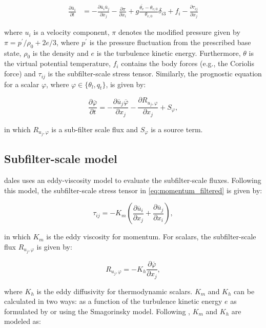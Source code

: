 \begin{align}
    \frac{\partial \overline{u}_i}{\partial t} &= - \frac{\partial \overline{u}_i \overline{u}_j}{\partial x_j} - \frac{\partial \pi}{\partial x_i} + g \frac{\overline{\theta_v} - \theta_{v,0}}{\theta_{v,0}} \delta_{i3} + f_i - \frac{\partial \tau_{ij}}{\partial x_j} \label{eq:momentum_conservation}
\end{align}

where $u_i$ is a velocity component, $\pi$ denotes the modified pressure given by $\pi = p^\prime/\rho_0 + 2e/3$, where $p^\prime$ is the pressure fluctuation from the prescribed base state, $\rho_0$ is the density and $e$ is the turbulence kinetic energy. Furthermore, $\theta$ is the virtual potential temperature, $f_i$ contains the body forces (e.g., the Coriolis force) and $\tau_{ij}$ is the subfilter-scale stress tensor. Similarly, the prognostic equation for a scalar $\varphi$, where $\varphi \in \{\theta_l, q_t\}$, is given by:

\begin{equation}
    \frac{\partial \overline{\varphi}}{\partial t} = - \frac{\partial \overline{u}_j \overline{\varphi}}{\partial x_j} - \frac{\partial R_{u_j,\varphi}}{\partial x_j} + S_\varphi,
\end{equation}

in which $R_{u_j,\varphi}$ is a sub-filter scale flux and $S_\varphi$ is a source term.

\subsection{Subfilter-scale model}
\acrshort{dales} uses an eddy-viscosity model to evaluate the subfilter-scale fluxes. Following this model, the subfilter-scale stress tensor in \autoref{eq:momentum_filtered} is given by:

\begin{equation}
    \tau_{ij} = - K_m \left( \frac{\partial \overline{u}_i}{\partial x_j} + \frac{\partial \overline{u}_j}{\partial x_i} \right),
\end{equation}

in which $K_m$ is the eddy viscosity for momentum. For scalars, the subfilter-scale flux $R_{u_j,\varphi}$ is given by:

\begin{equation}
    R_{u_j,\varphi} = - K_h \frac{\partial \overline{\varphi}}{\partial x_j},
\end{equation}

where $K_h$ is the eddy diffusivity for thermodynamic scalars. $K_m$ and $K_h$ can be calculated in two ways: as a function of the turbulence kinetic energy $e$ as formulated by \citet{deardorffStratocumuluscappedMixedLayers1980} or using the Smagorinsky model. Following \citet{deardorffStratocumuluscappedMixedLayers1980}, $K_m$ and $K_h$ are modeled as:

